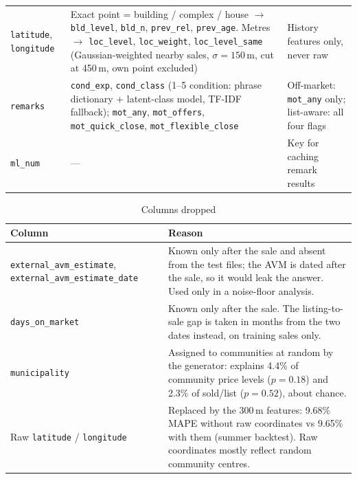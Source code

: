 \begin{table}[ht]
\begin{tabularx}{\textwidth}{p{2.7cm}Xp{3.3cm}}
\texttt{latitude}, \texttt{longitude} & Exact point = building / complex / house $\to$ \texttt{bld\_level}, \texttt{bld\_n}, \texttt{prev\_rel}, \texttt{prev\_age}. Metres $\to$ \texttt{loc\_level}, \texttt{loc\_weight}, \texttt{loc\_level\_same} (Gaussian-weighted nearby sales, $\sigma = 150$\,m, cut at 450\,m, own point excluded) & History features only, never raw \\
\texttt{remarks} & \texttt{cond\_exp}, \texttt{cond\_class} (1--5 condition: phrase dictionary + latent-class model, TF-IDF fallback); \texttt{mot\_any}, \texttt{mot\_offers}, \texttt{mot\_quick\_close}, \texttt{mot\_flexible\_close} & Off-market: \texttt{mot\_any} only; list-aware: all four flags \\
\texttt{ml\_num} & --- & Key for caching remark results \\
\hline
\end{tabularx}
\end{table}

\begin{table}[ht]
\centering
\small
\caption{Columns dropped}
\label{tab:columns-dropped}
\begin{tabularx}{\textwidth}{p{4.2cm}X}
\hline
Column & Reason \\
\hline
\texttt{external\_avm\_estimate}, \texttt{external\_avm\_estimate\_date} & Known only after the sale and absent from the test files; the AVM is dated after the sale, so it would leak the answer. Used only in a noise-floor analysis. \\
\texttt{days\_on\_market} & Known only after the sale. The listing-to-sale gap is taken in months from the two dates instead, on training sales only. \\
\texttt{municipality} & Assigned to communities at random by the generator: explains 4.4\% of community price levels ($p = 0.18$) and 2.3\% of sold/list ($p = 0.52$), about chance. \\
Raw \texttt{latitude} / \texttt{longitude} & Replaced by the 300\,m features: 9.68\% MAPE without raw coordinates vs 9.65\% with them (summer backtest). Raw coordinates mostly reflect random community centres. \\
\hline
\end{tabularx}
\end{table}

